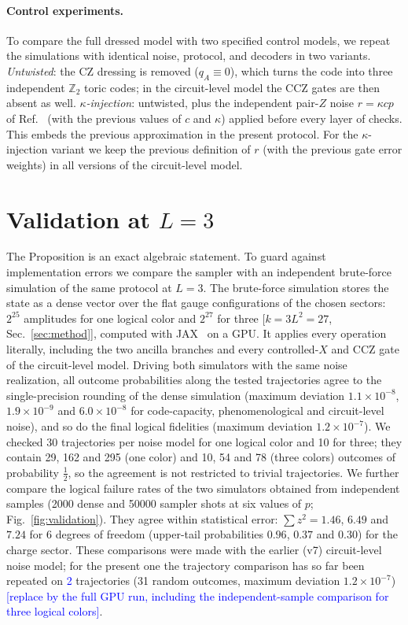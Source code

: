 \documentclass[a4paper]{article}
\newcommand{\blue}[1]{\textcolor{blue}{#1}}
\begin{document}
\paragraph{Control experiments.}
To compare the full dressed model with two specified control models, we repeat the simulations with identical noise, protocol, and decoders in two variants. \emph{Untwisted}: the CZ dressing is removed ($q_A\equiv0$), which turns the code into three independent $\mathbb{Z}_2$ toric codes; in the circuit-level model the CCZ gates are then absent as well. \emph{$\kappa$-injection}: untwisted, plus the independent pair-$Z$ noise $r=\kappa cp$ of Ref.~\cite{haga2026aqis} (with the previous values of $c$ and $\kappa$) applied before every layer of checks. This embeds the previous approximation in the present protocol. For the $\kappa$-injection variant we keep the previous definition of $r$ (with the previous gate error weights) in all versions of the circuit-level model.

\section{Validation at \texorpdfstring{$L=3$}{L=3}}
\label{sec:validation}

The Proposition is an exact algebraic statement. To guard against implementation errors we compare the sampler with an independent brute-force simulation of the same protocol at $L=3$. The brute-force simulation stores the state as a dense vector over the flat gauge configurations of the chosen sectors: $2^{25}$ amplitudes for one logical color and $2^{27}$ for three [$k=3L^2=27$, Sec.~\ref{sec:method}], computed with JAX~\cite{jax2018github} on a GPU. It applies every operation literally, including the two ancilla branches and every controlled-$X$ and CCZ gate of the circuit-level model. Driving both simulators with the same noise realization, all outcome probabilities along the tested trajectories agree to the single-precision rounding of the dense simulation (maximum deviation $1.1\times10^{-8}$, $1.9\times10^{-9}$ and $6.0\times10^{-8}$ for code-capacity, phenomenological and circuit-level noise), and so do the final logical fidelities (maximum deviation $1.2\times10^{-7}$). We checked 30 trajectories per noise model for one logical color and 10 for three; they contain 29, 162 and 295 (one color) and 10, 54 and 78 (three colors) outcomes of probability $\tfrac12$, so the agreement is not restricted to trivial trajectories. We further compare the logical failure rates of the two simulators obtained from independent samples (2000 dense and 50000 sampler shots at six values of $p$; Fig.~\ref{fig:validation}). They agree within statistical error: $\sum z^2=1.46$, $6.49$ and $7.24$ for 6 degrees of freedom (upper-tail probabilities $0.96$, $0.37$ and $0.30$) for the charge sector. These comparisons were made with the earlier (v7) circuit-level noise model; for the present one the trajectory comparison has so far been repeated on \blue{2} trajectories (31 random outcomes, maximum deviation $1.2\times10^{-7}$) \blue{[replace by the full GPU run, including the independent-sample comparison for three logical colors]}.
\end{document}
